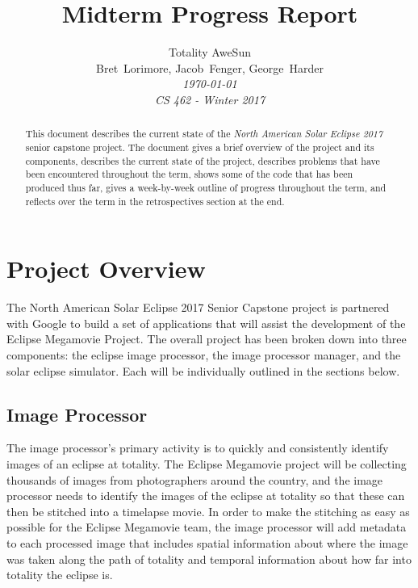 \documentclass[10pt, onecolumn, draftclsnofoot, letterpaper, compsoc]{IEEEtran}
\title{Midterm Progress Report}
\author{Totality AweSun \\
		Bret~Lorimore, Jacob~Fenger, George~Harder \\
		\textit{\today \\
		CS 462 - Winter 2017}}
\begin{document}
\maketitle

\begin{abstract}
This document describes the current state of the \textit{North American Solar Eclipse 2017}
senior capstone project. The document gives a brief overview of the project and its components,
describes the current state of the project, describes problems that have been
encountered throughout the term, shows some of the code that has been produced thus far, gives
a week-by-week outline of progress throughout the term, and reflects over the term in the
retrospectives section at the end.
\end{abstract}

\newpage

\tableofcontents

\newpage

\section{Project Overview}

The North American Solar Eclipse 2017 Senior Capstone project is partnered
with Google to build a set of applications that will assist the development of
the Eclipse Megamovie Project. The overall project has been broken down into
three components: the eclipse image processor, the image processor manager, and
the solar eclipse simulator. Each will be individually outlined in the sections
below.

\subsection{Image Processor}

The image processor’s primary activity is to quickly and consistently identify
images of an eclipse at totality. The Eclipse Megamovie project will be
collecting thousands of images from photographers around the country, and the
image processor needs to identify the images of the eclipse at totality so that
these can then be stitched into a timelapse movie. In order to make the
stitching as easy as possible for the Eclipse Megamovie team, the image
processor will add metadata to each processed image that includes spatial
information about where the image was taken along the path of totality and
temporal information about how far into totality the eclipse is.
\end{document}
